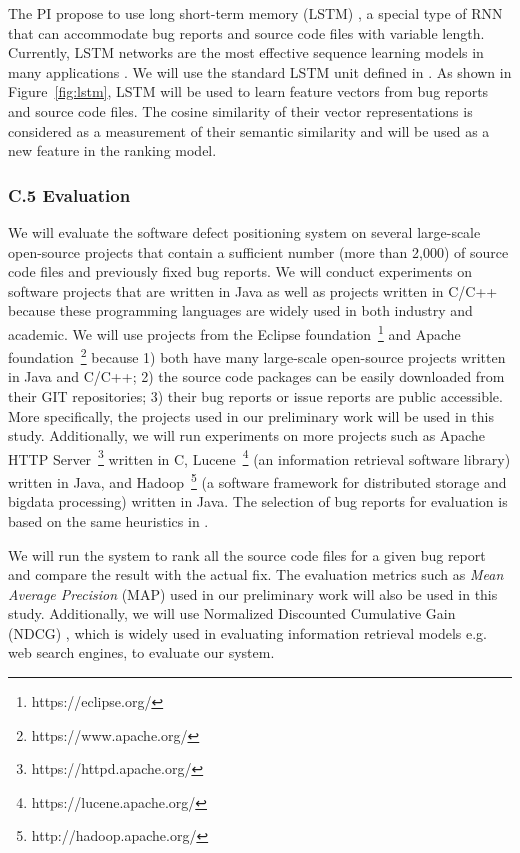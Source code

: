 The PI propose to use long short-term memory (LSTM) \cite{Hochreiter:1997:LSM:1246443.1246450}, a special type of RNN that can accommodate bug reports and source code files with variable length. Currently, LSTM networks are the most effective sequence learning models in many applications \cite{Goodfellow-et-al-2016}. We will use the standard LSTM unit defined in \cite{journals/corr/ZarembaSV14}. As shown in Figure~\ref{fig:lstm}, LSTM will be used to learn feature vectors from bug reports and source code files. The cosine similarity of their vector representations is considered as a measurement of their semantic similarity and will be used as a new feature in the ranking model.

\subsubsection{C.5 Evaluation}
We will evaluate the software defect positioning system on several large-scale open-source projects that contain a sufficient number (more than 2,000) of source code files and previously fixed bug reports. We will conduct experiments on software projects that are written in Java as well as projects written in C/C++ because these programming languages are widely used in both industry and academic. We will use projects from the Eclipse foundation~\footnote{https://eclipse.org/} and Apache foundation~\footnote{https://www.apache.org/} because 1) both have many large-scale open-source projects written in Java and C/C++; 2) the source code packages can be easily downloaded from their GIT repositories; 3) their bug reports or issue reports are public accessible. More specifically, the projects used in our preliminary work \cite{Ye:TSE15} will be used in this study. Additionally, we will run experiments on more projects such as Apache HTTP Server~\footnote{https://httpd.apache.org/} written in C, Lucene~\footnote{https://lucene.apache.org/} (an information retrieval software library) written in Java, and Hadoop~\footnote{http://hadoop.apache.org/} (a software framework for distributed storage and bigdata processing) written in Java. The selection of bug reports for evaluation is based on the same heuristics in \cite{Dallmeier:2007:EBL:1321631.1321702,Ye:FSE14}.

We will run the system to rank all the source code files for a given bug report and compare the result with the actual fix. The evaluation metrics such as \textit{Mean Average Precision} (MAP) \cite{Manning:2008:IIR:1394399} used in our preliminary work \cite{Ye:TSE15} will also be used in this study. Additionally, we will use Normalized Discounted Cumulative Gain (NDCG) \cite{Jarvelin:2002:CGE:582415.582418}, which is widely used in evaluating information retrieval models e.g. web search engines, to evaluate our system.

